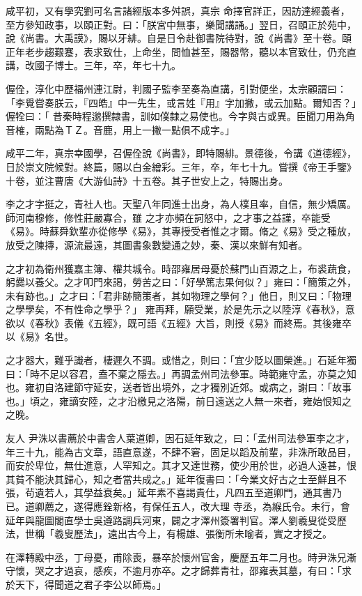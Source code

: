 \begin{pinyinscope}
 咸平初，又有學究劉可名言諸經版本多舛誤，真宗
 命擇官詳正，因訪達經義者，至方參知政事，以頤正對。曰：「朕宮中無事，樂聞講誦。」翌日，召頤正於苑中，說《尚書。大禹謨》，賜以牙緋。自是日令赴御書院待對，說《尚書》至十卷。頤正年老步趨艱蹇，表求致仕，上命坐，問恤甚至，賜器幣，聽以本官致仕，仍充直講，改國子博士。三年，卒，年七十九。



 偓佺，淳化中歷福州連江尉，判國子監李至奏為直講，引對便坐，太宗顧謂曰：「李覺嘗奏朕云，『四皓』中一先生，或言姓『用』字加撇，或云加點。爾知否？」偓牷曰：「
 昔秦時程邈撰隸書，訓如僕隸之易使也。今字與古或異。臣聞刀用為角音榷，兩點為ＴＺ。音鹿，用上一撇一點俱不成字。」



 咸平二年，真宗幸國學，召偓佺說《尚書》，即特賜緋。景德後，令講《道德經》，日於崇文院候對。終篇，賜以白金繒彩。三年，卒，年七十九。嘗撰《帝王手鑒》十卷，並注曹唐《大游仙詩》十五卷。其子世安上之，特賜出身。



 李之才字挺之，青社人也。天聖八年同進士出身，為人樸且率，自信，無少矯厲。師河南穆修，修性莊嚴寡合，雖
 之才亦頻在訶怒中，之才事之益謹，卒能受《易》。時蘇舜欽輩亦從修學《易》，其專授受者惟之才爾。脩之《易》受之種放，放受之陳摶，源流最遠，其圖書象數變通之妙，秦、漢以來鮮有知者。



 之才初為衛州獲嘉主簿、權共城令。時邵雍居母憂於蘇門山百源之上，布裘蔬食，躬爨以養父。之才叩門來謁，勞苦之曰：「好學篤志果何似？」雍曰：「簡策之外，未有跡也。」之才曰：「君非跡簡策者，其如物理之學何？」他日，則又曰：「物理之學學矣，不有性命之學乎？」
 雍再拜，願受業，於是先示之以陸淳《春秋》，意欲以《春秋》表儀《五經》，既可語《五經》大旨，則授《易》而終焉。其後雍卒以《易》名世。



 之才器大，難乎識者，棲遲久不調。或惜之，則曰：「宜少貶以圖榮進。」石延年獨曰：「時不足以容君，盍不棄之隱去。」再調孟州司法參軍。時範雍守孟，亦莫之知也。雍初自洛建節守延安，送者皆出境外，之才獨別近郊。或病之，謝曰：「故事也。」頃之，雍謫安陸，之才沿檄見之洛陽，前日遠送之人無一來者，雍始恨知之之晚。



 友人
 尹洙以書薦於中書舍人葉道卿，因石延年致之，曰：「孟州司法參軍李之才，年三十九，能為古文章，語直意遂，不肆不窘，固足以蹈及前輩，非洙所敢品目，而安於卑位，無仕進意，人罕知之。其才又達世務，使少用於世，必過人遠甚，恨其貧不能決其歸心，知之者當共成之。」延年復書曰：「今業文好古之士至鮮且不張，茍遺若人，其學益衰矣。」延年素不喜謁貴仕，凡四五至道卿門，通其書乃已。道卿薦之，遂得應銓新格，有保任五人，改大理
 寺丞，為緱氏令。未行，會延年與龍圖閣直學士吳遵路調兵河東，闢之才澤州簽署判官。澤人劉羲叟從受歷法，世稱「羲叟歷法」，遠出古今上，有楊雄、張衡所未喻者，實之才授之。



 在澤轉殿中丞，丁母憂，甫除喪，暴卒於懷州官舍，慶歷五年二月也。時尹洙兄漸守懷，哭之才過哀，感疾，不逾月亦卒。之才歸葬青社，邵雍表其墓，有曰：「求於天下，得聞道之君子李公以師焉。」



\end{pinyinscope}